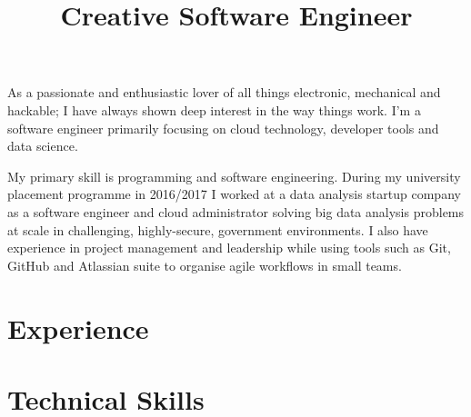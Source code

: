 \documentclass[10pt,a4paper,sans]{moderncv}
\title{Creative Software Engineer}
\begin{document}
\makecvtitle

%
%

As a passionate and enthusiastic lover of all things electronic, mechanical and hackable; I have always shown deep interest in the way things work. I'm a software engineer primarily focusing on cloud technology, developer tools and data science.\newline{}

My primary skill is programming and software engineering. During my university placement programme in 2016/2017 I worked at a data analysis startup company as a software engineer and cloud administrator solving big data analysis problems at scale in challenging, highly-secure, government environments. I also have experience in project management and leadership while using tools such as Git, GitHub and Atlassian suite to organise agile workflows in small teams.

%
%

\section{Experience}

%
%

\section{Technical Skills}
\begin{cvcolumns}
\end{cvcolumns}
\end{document}
